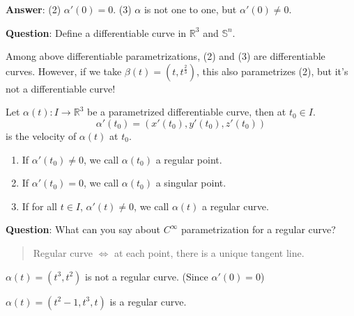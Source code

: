 \noindent
\textbf{Answer}:
    (2) $\alpha'(0)=0$.
    (3) $\alpha$ is not one to one, but $\alpha'(0)\neq 0$.

\noindent 
\textbf{Question}: Define a differentiable curve in $\mathbb{R}^3$ and $\mathbb{S}^n$.
\begin{remark}
    Among above differentiable parametrizations, (2) and (3) are differentiable curves. However, if we take $\beta(t)=(t,t^{\frac{2}{3}})$, this also parametrizes (2), but it's not a differentiable curve!
\end{remark}
\begin{definition}
    Let $\alpha(t)\colon I\to \mathbb{R}^3$ be a parametrized differentiable curve, then at $t_0\in I$.
    \[ \alpha'(t_0)=(x'(t_0),y'(t_0),z'(t_0))\]
    is the velocity of $\alpha(t)$ at $t_0$.
    \begin{enumerate}[(1)]
        \item If $\alpha'(t_0)\neq 0$, we call $\alpha(t_0)$ a regular point.
        \item If $\alpha'(t_0) = 0$, we call $\alpha(t_0)$ a singular point.
        \item If for all $t\in I$, $\alpha'(t)\neq 0$, we call $\alpha(t)$ a regular curve.
    \end{enumerate}
\end{definition}
\noindent
\textbf{Question}: What can you say about $C^\infty$ parametrization for a regular curve?
\begin{quotation}
Regular curve $\Longleftrightarrow $ at each point, there is a unique tangent line.
\end{quotation}
\begin{example}
$\alpha(t)=(t^3,t^2)$ is not a regular curve. (Since $\alpha'(0)=0$)
\begin{center}
\end{center}
\end{example}
\begin{example}
$\alpha(t)=(t^2-1,t^3,t)$ is a regular curve.
\begin{center}
\end{center}
\end{example}

